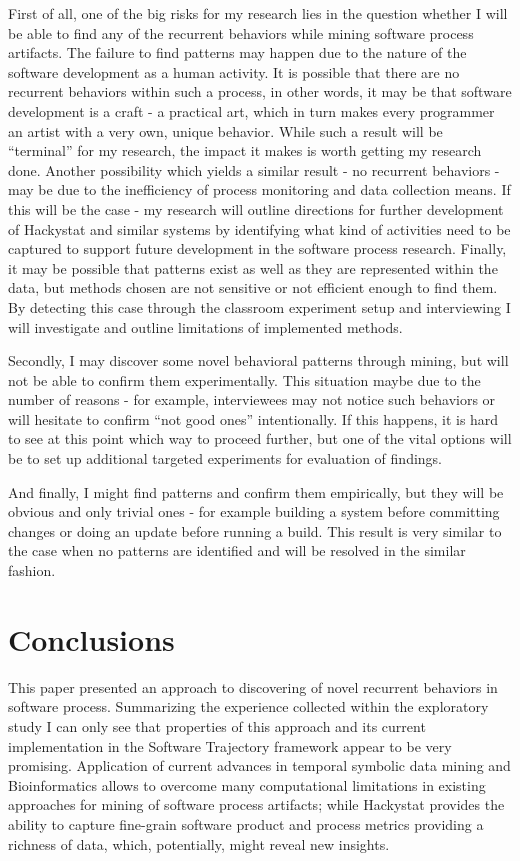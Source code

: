 \documentclass{sig-alternate}
\begin{document}
First of all, one of the big risks for my research lies in the question whether I will be able to find any of the recurrent behaviors while mining software process artifacts. The failure to find patterns may happen due to the nature of the software development as a human activity. It is possible that there are no recurrent behaviors within such a process, in other words, it may be that software development is a craft - a practical art, which in turn makes every programmer an artist with a very own, unique behavior. While such a result will be ``terminal'' for my research, the impact it makes is worth getting my research done. Another possibility which yields a similar result - no recurrent behaviors - may be due to the inefficiency of process monitoring and data collection means. If this will be the case - my research will outline directions for further development of Hackystat and similar systems by identifying what kind of activities need to be captured to support future development in the software process research. Finally, it may be possible that patterns exist as well as they are represented within the data, but methods chosen are not sensitive or not efficient enough to find them. By detecting this case through the classroom experiment setup and interviewing I will investigate and outline limitations of implemented methods.

Secondly, I may discover some novel behavioral patterns through mining, but will not be able to confirm them experimentally. This situation maybe due to the number of reasons - for example, interviewees may not notice such behaviors or will hesitate to confirm ``not good ones'' intentionally. If this happens, it is hard to see at this point which way to proceed further, but one of the vital options will be to set up additional targeted experiments for evaluation of findings.

And finally, I might find patterns and confirm them empirically, but they will be obvious and only trivial ones - for example building a system before committing changes or doing an update before running a build. This result is very similar to the case when no patterns are identified and will be resolved in the similar fashion.

\section{Conclusions}
This paper presented an approach to discovering of novel recurrent behaviors in software process. Summarizing the experience collected within the exploratory study I can only see that properties of this approach and its current implementation in the Software Trajectory framework appear to be very promising. Application of current advances in temporal symbolic data mining and Bioinformatics allows to overcome many computational limitations in existing approaches for mining of software process artifacts; while Hackystat provides the ability to capture fine-grain software product and process metrics providing a richness of data, which, potentially, might reveal new insights.
\end{document}
